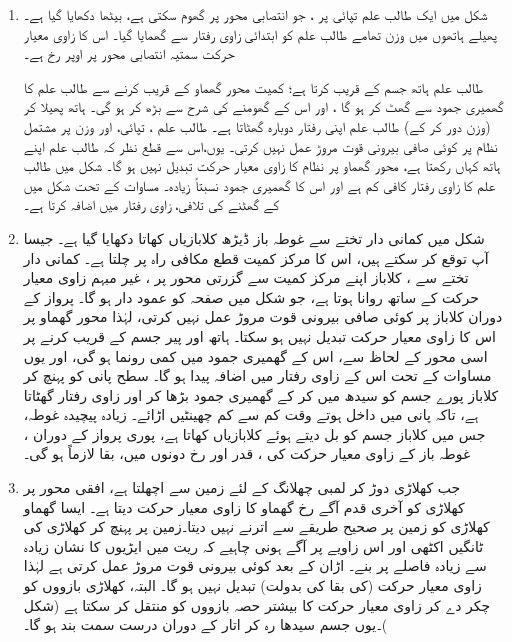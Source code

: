 \begin{enumerate}[1.]
\item
 \quad
شکل  میں ایک طالب علم   تپائی  پر ، جو انتصابی محور پر گھوم سکتی ہے، بیٹھا دکھایا گیا ہے۔ پھیلے  ہاتھوں میں   وزن تھامے طالب علم کو ابتدائی زاوی رفتار  سے گھمایا گیا۔ اس کا زاوی معیار حرکت سمتیہ  انتصابی محور پر اوپر رخ ہے۔

طالب علم ہاتھ جسم کے قریب کرتا ہے؛ کمیت محور گھماو کے قریب کرنے سے    طالب علم  کا گھمیری جمود  سے گھٹ کر  ہو گا ، اور اس کے گھومنے کی شرح  سے  بڑھ کر  ہو گی۔  ہاتھ  پھیلا کر (وزن دور کر کے)  طالب علم اپنی رفتار  دوبارہ گھٹاتا ہے۔
 طالب علم ، تپائی، اور وزن  پر مشتمل نظام پر کوئی صافی بیرونی قوت مروڑ عمل نہیں کرتی۔ یوں،اس سے قطع نظر کہ طالب علم اپنے ہاتھ کہاں رکھتا ہے،  محور گھماو پر  نظام  کا  زاوی معیار حرکت تبدیل نہیں ہو گا۔ شکل  میں  طالب علم کا زاوی رفتار  کافی کم ہے اور اس کا گھمیری جمود    نسبتاً زیادہ۔ مساوات   کے تحت شکل  میں     کے گھٹنے  کی تلافی،   زاوی رفتار  میں اضافہ کرتا ہے۔
 \item
 \quad
 شکل  میں کمانی دار تختے  سے غوطہ باز      ڈیڑھ کلابازیاں کھاتا دکھایا گیا ہے۔ جیسا آپ توقع کر سکتے ہیں، اس کا  مرکز کمیت قطع مکافی راہ پر چلتا ہے۔ کمانی دار تختے سے   ،  کلاباز  اپنے  مرکز کمیت  سے گزرتی محور  پر ، غیر   مبہم زاوی معیار حرکت   کے ساتھ روانا ہوتا ہے، جو شکل  میں صفحہ کو عمود دار ہو گا۔ پرواز کے دوران کلاباز پر کوئی صافی بیرونی قوت مروڑ عمل نہیں کرتی، لہٰذا  محور گھماو پر اس کا زاوی معیار حرکت تبدیل نہیں ہو سکتا۔ ہاتھ اور پیر جسم کے قریب کرنے پر اسی محور کے لحاظ سے، اس کے  گھمیری جمود   میں کمی رونما ہو گی،  اور یوں مساوات  کے تحت  اس کے  زاوی رفتار  میں اضافہ پیدا ہو گا۔ سطح پانی کو پہنچ کر کلاباز  پورے جسم کو سیدھ میں کر کے   گھمیری جمود بڑھا کر اور زاوی رفتار گھٹاتا ہے، تاکہ پانی میں  داخل ہوتے وقت کم سے کم چھینٹیں اڑائے۔ زیادہ پیچیدہ غوطہ،  جس میں کلاباز جسم کو بل دیتے ہوئے کلابازیاں کھاتا ہے، پوری پرواز    کے دوران ، غوطہ باز کے زاوی معیار حرکت  کی ، قدر اور رخ دونوں میں، بقا لازماً ہو گی۔
 \item
{}\quad
جب کھلاڑی دوڑ کر لمبی چھلانگ  کے لئے زمین سے اچھلتا ہے،  افقی محور پر کھلاڑی کو آخری قدم  آگے     رخ  گھماو کا زاوی معیار حرکت  دیتا ہے۔ ایسا گھماو کھلاڑی کو زمین پر  صحیح   طریقے سے اترنے نہیں دیتا۔زمین پر پہنچ کر کھلاڑی کی ٹانگیں  اکٹھی اور   اس زاویے پر آگے ہونی چاہیے  کہ ریت میں ایڑیوں کا نشان زیادہ سے زیادہ فاصلے پر بنے۔ اڑان کے بعد کوئی بیرونی قوت مروڑ عمل کرتی ہے لہٰذا  زاوی معیار حرکت  (کی  بقا کی بدولت)  تبدیل نہیں ہو گا۔ البتہ، کھلاڑی  بازووں کو   چکر دے کر زاوی  معیار حرکت کا بیشتر حصہ بازووں کو منتقل کر سکتا ہے (شکل )۔یوں جسم  سیدھا رہ کر اتار کے دوران  درست سمت بند ہو گا۔

\end{enumerate}
